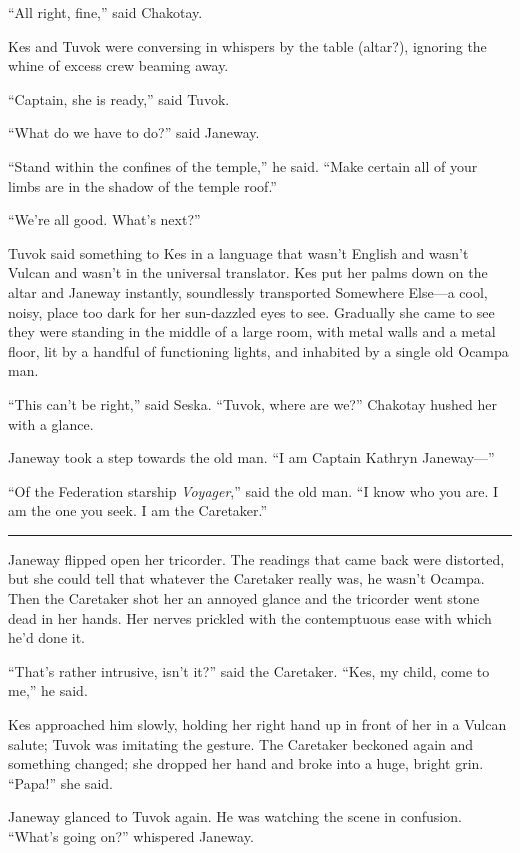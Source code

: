 \documentclass[twoside,letterpaper,12pt]{memoir}
\begin{document}
``All right, fine,'' said Chakotay.

Kes and Tuvok were conversing in whispers by the table (altar?), ignoring the whine of excess crew beaming away. 

``Captain, she is ready,'' said Tuvok. 

``What do we have to do?'' said Janeway. 

``Stand within the confines of the temple,'' he said. ``Make certain all of your limbs are in the shadow of the temple roof.'' 

``We're all good. What's next?'' 

Tuvok said something to Kes in a language that wasn't English and wasn't Vulcan and wasn't in the universal translator. Kes put her palms down on the altar and Janeway instantly, soundlessly transported Somewhere Else---a cool, noisy, place too dark for her sun-dazzled eyes to see. Gradually she came to see they were standing in the middle of a large room, with metal walls and a metal floor, lit by a handful of functioning lights, and inhabited by a single old Ocampa man. 

``This can't be right,'' said Seska. ``Tuvok, where are we?'' Chakotay hushed her with a glance. 

Janeway took a step towards the old man. ``I am Captain Kathryn Janeway---'' 

``Of the Federation starship \textit{Voyager},'' said the old man. ``I know who you are. I am the one you seek. I am the Caretaker.'' 

\fancybreak{\rule{3cm}{0.4 pt}} 

Janeway flipped open her tricorder. The readings that came back were distorted, but she could tell that whatever the Caretaker really was, he wasn't Ocampa. Then the Caretaker shot her an annoyed glance and the tricorder went stone dead in her hands. Her nerves prickled with the contemptuous ease with which he'd done it. 

``That's rather intrusive, isn't it?'' said the Caretaker. ``Kes, my child, come to me,'' he said. 

Kes approached him slowly, holding her right hand up in front of her in a Vulcan salute; Tuvok was imitating the gesture. The Caretaker beckoned again and something changed; she dropped her hand and broke into a huge, bright grin. ``Papa!'' she said. 

Janeway glanced to Tuvok again. He was watching the scene in confusion. ``What's going on?'' whispered Janeway. 
\end{document}
